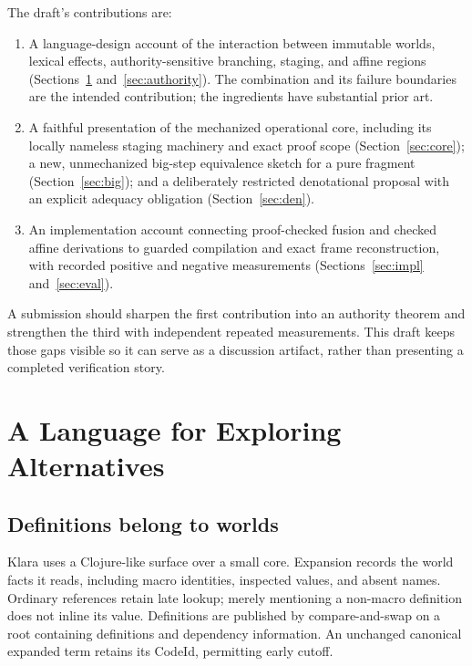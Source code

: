 \documentclass[acmsmall,screen,review,nonacm]{acmart}
\begin{document}
The draft's contributions are:
\begin{enumerate}
\item A language-design account of the interaction between immutable worlds,
lexical effects, authority-sensitive branching, staging, and affine regions
(Sections~\ref{sec:overview} and~\ref{sec:authority}). The combination and its
failure boundaries are the intended contribution; the ingredients have substantial
prior art.
\item A faithful presentation of the mechanized operational core, including
its locally nameless staging machinery and exact proof scope
(Section~\ref{sec:core}); a new, unmechanized big-step equivalence sketch for a
pure fragment (Section~\ref{sec:big}); and a deliberately restricted denotational
proposal with an explicit adequacy obligation (Section~\ref{sec:den}).
\item An implementation account connecting proof-checked fusion and checked
affine derivations to guarded compilation and exact frame reconstruction, with
recorded positive and negative measurements (Sections~\ref{sec:impl}
and~\ref{sec:eval}).
\end{enumerate}
A submission should sharpen the first contribution into an authority theorem
and strengthen the third with independent repeated measurements. This draft
keeps those gaps visible so it can serve as a discussion artifact, rather than
presenting a completed verification story.

\section{A Language for Exploring Alternatives}\label{sec:overview}
\subsection{Definitions belong to worlds}
Klara uses a Clojure-like surface over a small core. Expansion records the
world facts it reads, including macro identities, inspected values, and absent
names. Ordinary references retain late lookup; merely mentioning a non-macro
definition does not inline its value. Definitions are published by compare-and-swap
on a root containing definitions and dependency information. An unchanged
canonical expanded term retains its CodeId, permitting early cutoff.
\end{document}

